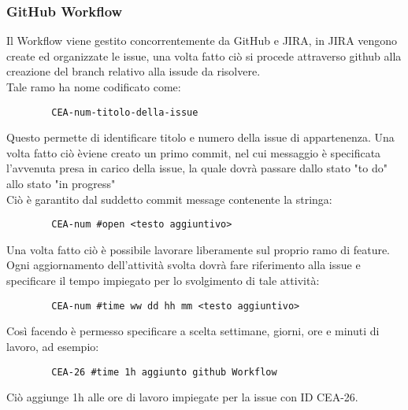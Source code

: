     \subsubsection{GitHub Workflow}
    Il Workflow viene gestito concorrentemente da GitHub e JIRA, in JIRA vengono create ed organizzate le issue, una volta fatto ciò si procede attraverso github alla creazione del branch relativo alla issude da risolvere.\\
    Tale ramo ha nome codificato come:
    \begin{lstlisting}
        CEA-num-titolo-della-issue
    \end{lstlisting}
    Questo permette di identificare titolo e numero della issue di appartenenza. Una volta fatto ciò èviene creato un primo commit, nel cui messaggio è specificata l'avvenuta presa in carico della issue, la quale dovrà passare dallo stato "to do" allo stato "in progress"\\
    Ciò è garantito dal suddetto commit message contenente la stringa:
    \begin{lstlisting}
        CEA-num #open <testo aggiuntivo>
    \end{lstlisting}
    Una volta fatto ciò è possibile lavorare liberamente sul proprio ramo di feature. Ogni aggiornamento dell'attività svolta dovrà fare riferimento alla issue e specificare il tempo impiegato per lo svolgimento di tale attività:
    \begin{lstlisting}
        CEA-num #time ww dd hh mm <testo aggiuntivo>
    \end{lstlisting}
    Così facendo è permesso specificare a scelta settimane, giorni, ore e minuti di lavoro, ad esempio:
    \begin{lstlisting}
        CEA-26 #time 1h aggiunto github Workflow
    \end{lstlisting}
    Ciò aggiunge 1h alle ore di lavoro impiegate per la issue con ID CEA-26.


